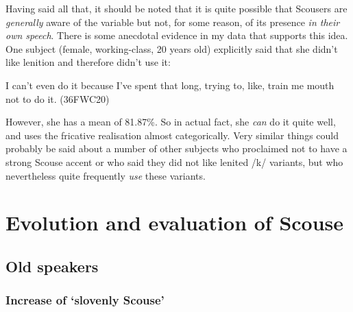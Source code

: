 Having said all that, it should be noted that it is quite possible that Scousers are \emph{generally} aware  of the variable but not, for some reason, of its presence \emph{in their own speech}.
There is some anecdotal evidence in my data that supports this idea.
One subject (female, working-class, 20 years old) explicitly said that she didn't like lenition and therefore didn't use it:
\begin{example}
	I can't even do it because I've spent that long, trying to, like, train me mouth not to do it. (36FWC20)
\end{example}
However, she has a mean  of 81.87\%.
So in actual fact, she \emph{can} do it quite well, and uses the fricative realisation almost categorically.
Very similar things could probably be said about a number of other subjects who proclaimed not to have a strong Scouse accent or who said they did not like lenited /k/ variants, but who nevertheless quite frequently \emph{use} these variants.

\section{Evolution and evaluation of Scouse}
\label{aware_res.eval}

\subsection{Old speakers}
\label{aware_res.eval.old}

\subsubsection{Increase of `slovenly Scouse'}
\label{aware_res.eval.old.change}

